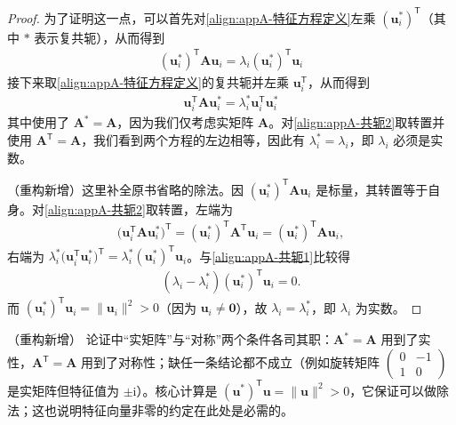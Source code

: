 \documentclass[../main.tex]{subfiles}
\begin{document}
\begin{proof}
为了证明这一点，可以首先对\eqref{align:appA-特征方程定义}左乘 $(\bm{u}_i^{*})^{\mathsf{T}}$（其中 $*$ 表示复共轭），从而得到
\begin{align}
  (\bm{u}_i^{*})^{\mathsf{T}}\bm{A}\bm{u}_i=\lambda_i(\bm{u}_i^{*})^{\mathsf{T}}\bm{u}_i
  \label{align:appA-共轭1}
\end{align}
接下来取\eqref{align:appA-特征方程定义}的复共轭并左乘 $\bm{u}_i^{\mathsf{T}}$，从而得到
\begin{align}
  \bm{u}_i^{\mathsf{T}}\bm{A}\bm{u}_i^{*}=\lambda_i^{*}\bm{u}_i^{\mathsf{T}}\bm{u}_i^{*}
  \label{align:appA-共轭2}
\end{align}
其中使用了 $\bm{A}^{*}=\bm{A}$，因为我们仅考虑实矩阵 $\bm{A}$。对\eqref{align:appA-共轭2}取转置并使用 $\bm{A}^{\mathsf{T}}=\bm{A}$，我们看到两个方程的左边相等，因此有 $\lambda_i^{*}=\lambda_i$，即 $\lambda_i$ 必须是实数。

（重构新增）这里补全原书省略的除法。因 $(\bm{u}_i^{*})^{\mathsf{T}}\bm{A}\bm{u}_i$ 是标量，其转置等于自身。对\eqref{align:appA-共轭2}取转置，左端为
\begin{align*}
  \bigl(\bm{u}_i^{\mathsf{T}}\bm{A}\bm{u}_i^{*}\bigr)^{\mathsf{T}}=(\bm{u}_i^{*})^{\mathsf{T}}\bm{A}^{\mathsf{T}}\bm{u}_i=(\bm{u}_i^{*})^{\mathsf{T}}\bm{A}\bm{u}_i,
\end{align*}
右端为 $\lambda_i^{*}\bigl(\bm{u}_i^{\mathsf{T}}\bm{u}_i^{*}\bigr)^{\mathsf{T}}=\lambda_i^{*}(\bm{u}_i^{*})^{\mathsf{T}}\bm{u}_i$。与\eqref{align:appA-共轭1}比较得
\begin{align*}
  (\lambda_i-\lambda_i^{*})(\bm{u}_i^{*})^{\mathsf{T}}\bm{u}_i=0.
\end{align*}
而 $(\bm{u}_i^{*})^{\mathsf{T}}\bm{u}_i=\|\bm{u}_i\|^{2}>0$（因为 $\bm{u}_i\neq\bm{0}$），故 $\lambda_i=\lambda_i^{*}$，即 $\lambda_i$ 为实数。
\end{proof}

\begin{remark}（重构新增）
论证中“实矩阵”与“对称”两个条件各司其职：$\bm{A}^{*}=\bm{A}$ 用到了实性，$\bm{A}^{\mathsf{T}}=\bm{A}$ 用到了对称性；缺任一条结论都不成立（例如旋转矩阵 $\begin{pmatrix}0&-1\\1&0\end{pmatrix}$ 是实矩阵但特征值为 $\pm\mathrm{i}$）。核心计算是 $(\bm{u}^{*})^{\mathsf{T}}\bm{u}=\|\bm{u}\|^{2}>0$，它保证可以做除法；这也说明特征向量非零的约定在此处是必需的。
\end{remark}
\end{document}
